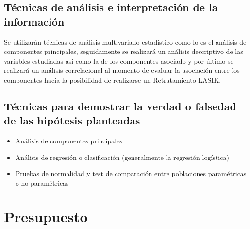 
\subsection{Técnicas de análisis e interpretación de la información}
Se utilizarán técnicas de análisis multivariado estadístico como lo es el análisis de componentes principales, seguidamente se realizará un análisis descriptivo de las variables estudiadas así como la de los componentes asociado y por último se realizará un análisis correlacional al momento de evaluar la asociación entre los componentes hacia la posibilidad de realizarse un Retratamiento LASIK.



\subsection{Técnicas para demostrar la verdad o falsedad de las hipótesis planteadas}
\begin{itemize}
    \item Análisis de componentes principales
    \item Análisis de regresión o clasificación (generalmente la regresión logística)
    \item Pruebas de normalidad y test de comparación entre poblaciones paramétricas o no paramétricas 
\end{itemize}

\newpage



\section{Presupuesto}


